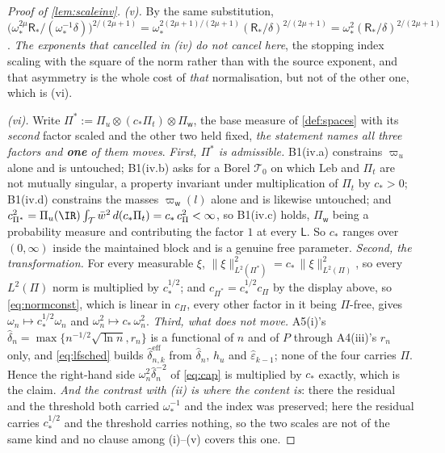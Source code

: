 \begin{proof}[Proof of \cref{lem:scaleinv}]
\emph{(v).} By the same substitution,
$\big(\omega_\ast^{2\mu}\mathsf R_\ast/(\omega_\ast^{-1}\delta)\big)^{2/(2\mu+1)}
=\omega_\ast^{2(2\mu+1)/(2\mu+1)}(\mathsf R_\ast/\delta)^{2/(2\mu+1)}
=\omega_\ast^{2}(\mathsf R_\ast/\delta)^{2/(2\mu+1)}$. \emph{The exponents that cancelled in (iv) do not
cancel here}, the stopping index scaling with the square of the norm rather than with the source
exponent, and that asymmetry is the whole cost of \emph{that} normalisation, but not of the other one,
which is (vi).

\emph{(vi).} Write $\Pi^{\ast}:=\Pi_u\otimes(c_\ast\Pi_t)\otimes\Pi_{\mathsf w}$, the base measure of
\cref{def:spaces} with its \emph{second} factor scaled and the other two held fixed, \emph{the
statement names all three factors and \textbf{one} of them moves}. \emph{First,
$\Pi^{\ast}$ is admissible.}
B1(iv.a)
constrains $\varpi_u$ alone and is untouched; B1(iv.b) asks for a Borel
$\mathcal T_0$ on which $\mathrm{Leb}$ and $\Pi_t$ are not mutually singular, a property invariant under
multiplication of $\Pi_t$ by $c_\ast>0$; B1(iv.d) constrains the masses
$\varpi_{\mathsf w}(l)$ alone and is likewise untouched; and
$c_{\Pi^{\ast}}^{2}=\Pi_u(\IR)\int_{\mathcal T}\bar w^{2}\,d(c_\ast\Pi_t)=c_\ast\,c_\Pi^{2}<\infty$, so
B1(iv.c)
holds, $\Pi_{\mathsf w}$ being a probability measure and contributing the factor $1$ at every
$\mathsf L$. So $c_\ast$ ranges over $(0,\infty)$ inside the maintained block and is a genuine free
parameter. \emph{Second, the transformation.} For every measurable $\xi$,
$\|\xi\|^{2}_{L^{2}(\Pi^{\ast})}=c_\ast\,\|\xi\|^{2}_{L^{2}(\Pi)}$, so every $L^{2}(\Pi)$ norm is
multiplied by
$c_\ast^{1/2}$; and $c_{\Pi^{\ast}}=c_\ast^{1/2}c_\Pi$ by the display above, so \eqref{eq:normconst}, 
which is
linear in $c_\Pi$, every other factor in it being $\Pi$-free, gives
$\omega_n\mapsto c_\ast^{1/2}\omega_n$
and $\omega_n^{2}\mapsto c_\ast\,\omega_n^{2}$. \emph{Third, what does not move.} A5(i)'s
$\hat\delta_n=\max\{n^{-1/2}\sqrt{\ln n},r_n\}$ is a functional of $n$ and of $P$ through A4(iii)'s $r_n$
only, and \eqref{eq:lfsched} builds $\hat\delta^{\mathrm{eff}}_{n,k}$ from $\hat\delta_n$, $h_u$ and
$\hat\varepsilon_{k-1}$; none of the four carries $\Pi$. Hence the right-hand side
$\omega_n^{2}\hat\delta_n^{-2}$ of \eqref{eq:cap} is multiplied by $c_\ast$ exactly, which is the claim.
\emph{And the contrast with (ii) is where the content is}: there the residual and the threshold both
carried $\omega_\ast^{-1}$ and the index was preserved; here the residual carries $c_\ast^{1/2}$ and the
threshold carries nothing, so the two scales are not of the same kind and no clause among
\textup{(i)}--\textup{(v)} covers this one.
\end{proof}


